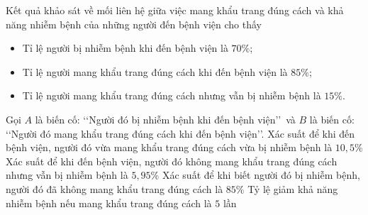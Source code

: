 \begin{ex}%
Kết quả khảo sát về mối liên hệ giữa việc mang khẩu trang đúng cách và khả năng nhiễm bệnh của những người đến bệnh viện cho thấy
	\begin{itemize}
		\item Tỉ lệ người bị nhiễm bệnh khi đến bệnh viện là $70\%$;
		\item Tỉ lệ người mang khẩu trang đúng cách khi đến bệnh viện là $85\%$;
		\item Tỉ lệ người mang khẩu trang đúng cách nhưng vẫn bị nhiễm bệnh là $15\%$.
	\end{itemize}
Gọi $A$ là biến cố: \lq\lq Người đó bị nhiễm bệnh khi đến bệnh viện\rq\rq\, và $B$ là biến cố: \lq\lq Người đó mang khẩu trang đúng cách khi đến bệnh viện\rq\rq.
	\choiceTF
	{\True Xác suất để khi đến bệnh viện, người đó vừa mang khẩu trang đúng cách vừa bị nhiễm bệnh là $10{,}5\%$}
	{Xác suất để khi đến bệnh viện, người đó không mang khẩu trang đúng cách nhưng vẫn bị nhiễm bệnh là $5{,}95\%$}
	{\True Xác suất để khi biết người đó bị nhiễm bệnh, người đó đã không mang khẩu trang đúng cách là $85\%$}
	{Tỷ lệ giảm khả năng nhiễm bệnh nếu mang khẩu trang đúng cách là $5$ lần}
\end{ex}
